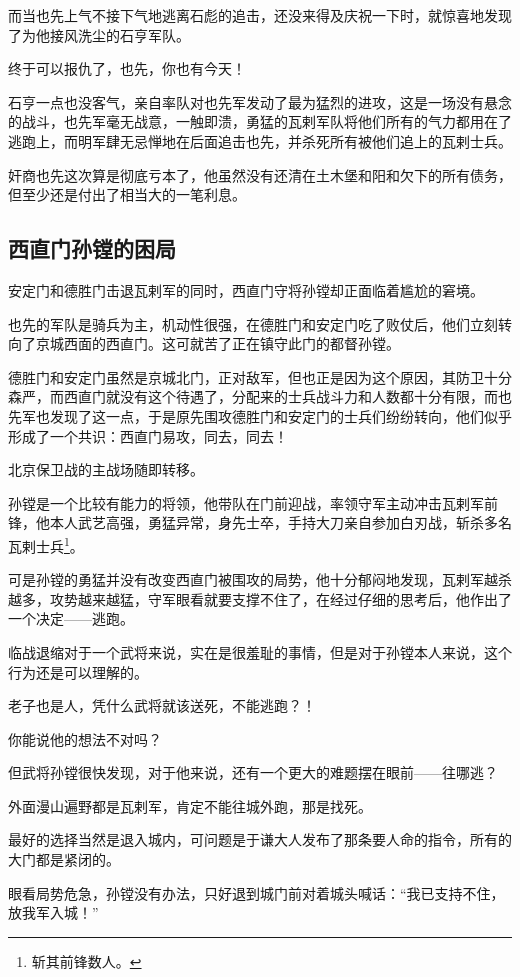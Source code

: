 \begin{multicols}{\theparacolNo}
而当也先上气不接下气地逃离石彪的追击，还没来得及庆祝一下时，就惊喜地发现了为他接风洗尘的石亨军队。

终于可以报仇了，也先，你也有今天！

石亨一点也没客气，亲自率队对也先军发动了最为猛烈的进攻，这是一场没有悬念的战斗，也先军毫无战意，一触即溃，勇猛的瓦剌军队将他们所有的气力都用在了逃跑上，而明军肆无忌惮地在后面追击也先，并杀死所有被他们追上的瓦剌士兵。

奸商也先这次算是彻底亏本了，他虽然没有还清在土木堡和阳和欠下的所有债务，但至少还是付出了相当大的一笔利息。

\subsection{西直门孙镗的困局}
安定门和德胜门击退瓦剌军的同时，西直门守将孙镗却正面临着尴尬的窘境。

也先的军队是骑兵为主，机动性很强，在德胜门和安定门吃了败仗后，他们立刻转向了京城西面的西直门。这可就苦了正在镇守此门的都督孙镗。

德胜门和安定门虽然是京城北门，正对敌军，但也正是因为这个原因，其防卫十分森严，而西直门就没有这个待遇了，分配来的士兵战斗力和人数都十分有限，而也先军也发现了这一点，于是原先围攻德胜门和安定门的士兵们纷纷转向，他们似乎形成了一个共识：西直门易攻，同去，同去！

北京保卫战的主战场随即转移。

孙镗是一个比较有能力的将领，他带队在门前迎战，率领守军主动冲击瓦剌军前锋，他本人武艺高强，勇猛异常，身先士卒，手持大刀亲自参加白刃战，斩杀多名瓦剌士兵\footnote{斩其前锋数人。}。

可是孙镗的勇猛并没有改变西直门被围攻的局势，他十分郁闷地发现，瓦剌军越杀越多，攻势越来越猛，守军眼看就要支撑不住了，在经过仔细的思考后，他作出了一个决定——逃跑。

临战退缩对于一个武将来说，实在是很羞耻的事情，但是对于孙镗本人来说，这个行为还是可以理解的。

老子也是人，凭什么武将就该送死，不能逃跑？！

你能说他的想法不对吗？

但武将孙镗很快发现，对于他来说，还有一个更大的难题摆在眼前——往哪逃？

外面漫山遍野都是瓦剌军，肯定不能往城外跑，那是找死。

最好的选择当然是退入城内，可问题是于谦大人发布了那条要人命的指令，所有的大门都是紧闭的。

眼看局势危急，孙镗没有办法，只好退到城门前对着城头喊话：“我已支持不住，放我军入城！”


\end{multicols}
